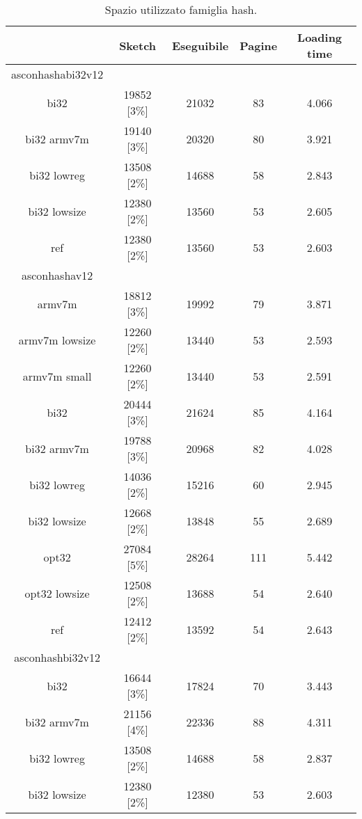 \begin{table}[h]
    \caption{Spazio utilizzato famiglia hash.}
    \centering
	\begin{tabular}{|c|c|c|c|c|}
		\hline
         & Sketch & Eseguibile & Pagine & Loading time \\
        \hline
        asconhashabi32v12 & & & & \\
        \hline
        bi32 & 19852 [3\%] & 21032 & 83 & 4.066 \\
        \hline
        bi32 armv7m & 19140 [3\%] & 20320 & 80 & 3.921 \\
        \hline
        bi32 lowreg & 13508 [2\%] & 14688 & 58 & 2.843 \\
        \hline
        bi32 lowsize & 12380 [2\%] & 13560 & 53 & 2.605 \\
        \hline
        ref & 12380 [2\%] & 13560 & 53 & 2.603 \\
        \hline
        asconhashav12 & & & & \\
        \hline
        armv7m & 18812 [3\%] & 19992 & 79 & 3.871 \\
        \hline
        armv7m lowsize & 12260 [2\%] & 13440 & 53 & 2.593 \\
        \hline
        armv7m small & 12260 [2\%] & 13440 & 53 & 2.591 \\
        \hline
        bi32 & 20444 [3\%] & 21624 & 85 & 4.164 \\
        \hline
        bi32 armv7m & 19788 [3\%] & 20968 & 82 & 4.028 \\
        \hline
        bi32 lowreg & 14036 [2\%] & 15216 & 60 & 2.945 \\
        \hline
        bi32 lowsize & 12668 [2\%] & 13848 & 55 & 2.689 \\
        \hline
        opt32 & 27084 [5\%] & 28264 & 111 & 5.442 \\
        \hline
        opt32 lowsize & 12508 [2\%] & 13688 & 54 & 2.640 \\
        \hline
        ref & 12412 [2\%] & 13592 & 54 & 2.643 \\
        \hline
        asconhashbi32v12 & & & & \\
        \hline
        bi32 & 16644 [3\%] & 17824 & 70 & 3.443 \\
        \hline
        bi32 armv7m & 21156 [4\%] & 22336 & 88 & 4.311 \\
        \hline
        bi32 lowreg & 13508 [2\%] & 14688 & 58 & 2.837 \\
        \hline
        bi32 lowsize & 12380 [2\%] & 12380 & 53 & 2.603 \\

\end{tabular}
\end{table}
